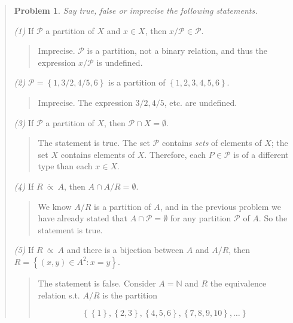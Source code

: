 \documentclass[a4paper, 12pt]{article}
\newtheorem{problem}{Problem}
\newtheorem{problem}{Problem}
\begin{document}
\small
\begin{quote}

\begin{problem}
    Say true, false or imprecise the following statements.
\end{problem}

\textit{(1)} If $\mathcal{P}$ a partition of $X$ and $x \in X$, then $x /
\mathcal{P} \in \mathcal{P}$.

\begin{quote}
    Imprecise. $\mathcal{P}$ is a partition, not a binary relation, and thus the
    expression $x / \mathcal{P}$ is undefined.
\end{quote}

\textit{(2)} $\mathcal{P} = \left\{ 1, 3 / 2, 4 / 5, 6 \right\} $ is a partition
of $\left\{ 1, 2, 3, 4, 5, 6 \right\} $.

\begin{quote}
    Imprecise. The expression $3 / 2, 4 / 5$, etc. are undefined.
\end{quote}

\textit{(3)} If $\mathcal{P}$ a partition of $X$, then $\mathcal{P} \cap X =
\emptyset$.

\begin{quote}
    The statement is true. The set $\mathcal{P}$ contains \textit{sets} of
    elements of $X$; the set $X$ contains elements of $X$. Therefore, each $P
    \in \mathcal{P}$ is of a different type than each $x \in X$.
\end{quote}

\textit{(4)} If $R ~ \ddot{\propto} ~ A$, then $A \cap A / R = \emptyset$.

\begin{quote}
    We know $A / R$ is a partition of $A$, and in the previous problem we have
    already stated that $A \cap \mathcal{P} = \emptyset$ for any partition
    $\mathcal{P}$ of $A$. So the statement is true.
\end{quote}

\textit{(5)} If $R ~ \ddot{\propto} ~ A$ and there is a bijection between $A$
and $A / R$, then $R = \left\{ (x, y ) \in A^2  : x = y \right\} $.

\begin{quote}
    The statement is false. Consider $A = \mathbb{N}$ and $R$ the equivalence
    relation s.t. $A / R$ is the partition 
    
    $$\left\{ \left\{ 1 \right\}, \left\{
    2, 3\right\}, \left\{ 4, 5, 6 \right\}, \left\{ 7, 8, 9, 10 \right\}, \ldots
\right\} $$


\end{quote}
\end{quote}
\end{document}
